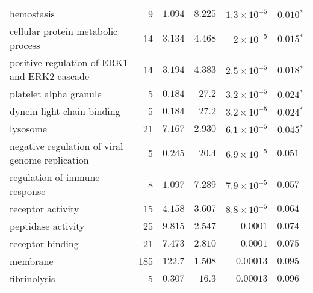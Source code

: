 \documentclass{article}
\begin{document}
\begin{longtable}{|l|r|r|r|r|r|}
                                        hemostasis &                       9 &                $ 1.094$ &   $ 8.225$ &  $1.3\times 10^{-5}$ &              $\bm{ 0.010{^*}}$ \\
                cellular protein metabolic process &                      14 &                $ 3.134$ &   $ 4.468$ &   $ 2\times 10^{-5}$ &              $\bm{ 0.015{^*}}$ \\
      positive regulation of ERK1 and ERK2 cascade &                      14 &                $ 3.194$ &   $ 4.383$ &  $2.5\times 10^{-5}$ &              $\bm{ 0.018{^*}}$ \\
                            platelet alpha granule &                       5 &                $ 0.184$ &   $  27.2$ &  $3.2\times 10^{-5}$ &              $\bm{ 0.024{^*}}$ \\
                        dynein light chain binding &                       5 &                $ 0.184$ &   $  27.2$ &  $3.2\times 10^{-5}$ &              $\bm{ 0.024{^*}}$ \\
                                          lysosome &                      21 &                $ 7.167$ &   $ 2.930$ &  $6.1\times 10^{-5}$ &              $\bm{ 0.045{^*}}$ \\
   negative regulation of viral genome replication &                       5 &                $ 0.245$ &   $  20.4$ &  $6.9\times 10^{-5}$ &                     $ 0.051~~$ \\
                     regulation of immune response &                       8 &                $ 1.097$ &   $ 7.289$ &  $7.9\times 10^{-5}$ &                     $ 0.057~~$ \\
                                 receptor activity &                      15 &                $ 4.158$ &   $ 3.607$ &  $8.8\times 10^{-5}$ &                     $ 0.064~~$ \\
                                peptidase activity &                      25 &                $ 9.815$ &   $ 2.547$ &             $0.0001$ &                     $ 0.074~~$ \\
                                  receptor binding &                      21 &                $ 7.473$ &   $ 2.810$ &             $0.0001$ &                     $ 0.075~~$ \\
                                          membrane &                     185 &                $ 122.7$ &   $ 1.508$ &            $0.00013$ &                     $ 0.095~~$ \\
                                      fibrinolysis &                       5 &                $ 0.307$ &   $  16.3$ &            $0.00013$ &                     $ 0.096~~$ \\

\end{longtable}
\end{document}
